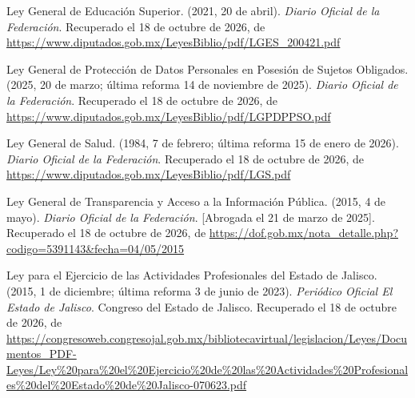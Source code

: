 \documentclass[12pt, a4paper]{article}
\begin{document}
\begin{list}{}{\setlength{\leftmargin}{1.27cm}\setlength{\itemindent}{-1.27cm}%
  \setlength{\labelwidth}{0pt}\setlength{\labelsep}{0pt}\setlength{\itemsep}{6pt}}
\item Ley General de Educación Superior. (2021, 20 de abril).
  \textit{Diario Oficial de la Federación}. Recuperado el 18 de octubre de 2026, de \url{https://www.diputados.gob.mx/LeyesBiblio/pdf/LGES_200421.pdf}
 

\item Ley General de Protección de Datos Personales en Posesión de
  Sujetos Obligados. (2025, 20 de marzo; última reforma 14 de
  noviembre de 2025). \textit{Diario Oficial de la Federación}. Recuperado el 18 de octubre de 2026, de \url{https://www.diputados.gob.mx/LeyesBiblio/pdf/LGPDPPSO.pdf}
 

\item Ley General de Salud. (1984, 7 de febrero; última reforma
  15 de enero de 2026). \textit{Diario Oficial de la Federación}. Recuperado el 18 de octubre de 2026, de \url{https://www.diputados.gob.mx/LeyesBiblio/pdf/LGS.pdf}

\item Ley General de Transparencia y Acceso a la Información
  Pública. (2015, 4 de mayo). \textit{Diario Oficial de la
   Federación}. [Abrogada el 21 de marzo de 2025].
  Recuperado el 18 de octubre de 2026, de \url{https://dof.gob.mx/nota_detalle.php?codigo=5391143&fecha=04/05/2015}
 
\item Ley para el Ejercicio de las Actividades Profesionales del
  Estado de Jalisco. (2015, 1 de diciembre; última reforma 3 de
  junio de 2023). \textit{Periódico Oficial El Estado de Jalisco}.
  Congreso del Estado de Jalisco. Recuperado el 18 de octubre de 2026, de \url{https://congresoweb.congresojal.gob.mx/bibliotecavirtual/legislacion/Leyes/Documentos_PDF-Leyes/Ley%20para%20el%20Ejercicio%20de%20las%20Actividades%20Profesionales%20del%20Estado%20de%20Jalisco-070623.pdf}


\end{list}
\end{document}
